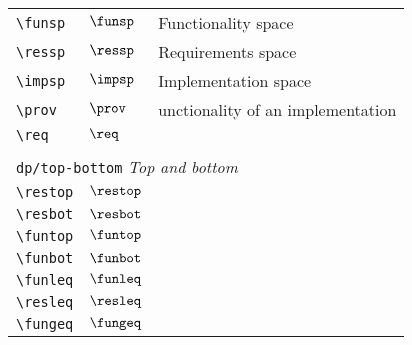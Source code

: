\begin{longtable}{lll}
  {\color[rgb]{0.5,0.5,0.5}\texttt{\textbackslash funsp}}                                                   & $\funsp$                   & Functionality space\\
  {\color[rgb]{0.5,0.5,0.5}\texttt{\textbackslash ressp}}                                                   & $\ressp$                   & Requirements space\\
  {\color[rgb]{0.5,0.5,0.5}\texttt{\textbackslash impsp}}                                                   & $\impsp$                   & Implementation space\\
  {\color[rgb]{0.5,0.5,0.5}\texttt{\textbackslash prov}}                                                    & $\prov$                    & unctionality of an implementation\\
  {\color[rgb]{0.5,0.5,0.5}\texttt{\textbackslash req}}                                                     & $\req$                     &                                                         \\
  &                            &                                                         \\
  \multicolumn{3}{l}{{\color[rgb]{0.5,0.5,0.5}\texttt{dp/top-bottom}} \emph{Top and bottom}}
  \\
  \hline
  {\color[rgb]{0.5,0.5,0.5}\texttt{\textbackslash restop}}                                                  & $\restop$                  & \\
  {\color[rgb]{0.5,0.5,0.5}\texttt{\textbackslash resbot}}                                                  & $\resbot$                  & \\
  {\color[rgb]{0.5,0.5,0.5}\texttt{\textbackslash funtop}}                                                  & $\funtop$                  & \\
  {\color[rgb]{0.5,0.5,0.5}\texttt{\textbackslash funbot}}                                                  & $\funbot$                  & \\
  {\color[rgb]{0.5,0.5,0.5}\texttt{\textbackslash funleq}}                                                  & $\funleq$                  & \\
  {\color[rgb]{0.5,0.5,0.5}\texttt{\textbackslash resleq}}                                                  & $\resleq$                  & \\
  {\color[rgb]{0.5,0.5,0.5}\texttt{\textbackslash fungeq}}                                                  & $\fungeq$                  & \\

\end{longtable}
